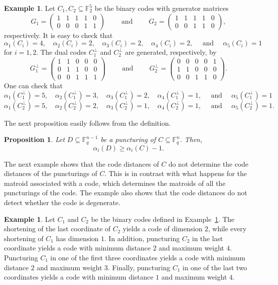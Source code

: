\documentclass[12pt]{amsart}
\numberwithin{equation}{section}
\newtheorem{proposition}[theorem]{Proposition}
\theoremstyle{definition}
\newtheorem{example}[theorem]{Example}
\newcommand{\FF}{\mathbb{F}}
\begin{document}
\begin{example}\label{ex:duality}
Let $C_1,C_2\subseteq\FF_2^5$ be the binary codes with generator matrices 
$$G_1=\begin{pmatrix} 1&1&1&1&0\\
0&0&0&1&1
\end{pmatrix} \qquad \text{ and } \qquad
G_2=\begin{pmatrix}1&1&1&1&0\\
0&0&1&1&0\end{pmatrix},$$
respectively. It is easy to check that 
\[\alpha_1(C_i)=4, \quad \alpha_2(C_i)=2, \quad \alpha_3(C_i)=2, \quad \alpha_4(C_i)=2, \quad \text{ and } \quad \alpha_5(C_i)=1\] for $i=1,2$.
The dual codes $C_1^\perp$ and $C_2^\perp$ are generated, respectively, by
$$G_1^\perp=\begin{pmatrix} 1&1&0&0&0\\
0&1&1&0&0\\
0&0&1&1&1
\end{pmatrix} \qquad \text{ and } \qquad 
G_2^\perp=\begin{pmatrix}0&0&0&0&1\\
1&1&0&0&0\\
0&0&1&1&0\end{pmatrix}.$$
One can check that
\[\alpha_1(C_1^\perp)=5, \quad \alpha_2(C_1^\perp)=3, \quad \alpha_3(C_1^\perp)=2, \quad \alpha_4(C_1^\perp)=1, \quad \text{ and } \quad \alpha_5(C_1^\perp)=1\]
\[\alpha_1(C_2^\perp)=5, \quad \alpha_2(C_2^\perp)=2, \quad \alpha_3(C_2^\perp)=1, \quad \alpha_4(C_2^\perp)=1, \quad \text{ and } \quad \alpha_5(C_2^\perp)=1.\]
\end{example}

The next proposition easily follows from the definition.

\begin{proposition}
Let $D\subseteq\FF_q^{n-1}$ be a puncturing of $C\subseteq\FF_q^n$. Then,
$$\alpha_i(D)\geq\alpha_i(C)-1.$$
\end{proposition}

The next example shows that the code distances of $C$ do not determine the code distances of the puncturings of $C$. This is in contrast with what happens for the matroid associated with a code, which determines the matroids of all the puncturings of the code. The example also shows that the code distances do not detect whether the code is degenerate.

\begin{example}\label{ex:shortening}
Let $C_1$ and $C_2$ be the binary codes defined in Example~\ref{ex:duality}. The shortening of the last coordinate of $C_2$ yields a code of dimension $2$, while every shortening of $C_1$ has dimension $1$. In addition, puncturing $C_2$ in the last coordinate yields a code with minimum distance $2$ and maximum weight $4$. Puncturing $C_1$ in one of the first three coordinates yields a code with minimum distance $2$ and maximum weight $3$. Finally, puncturing $C_1$ in one of the last two coordinates yields a code with minimum distance $1$ and maximum weight $4$.
\end{example}
\end{document}
